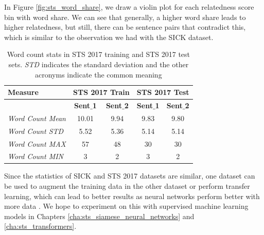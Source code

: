\begin{enumerate}
In Figure \ref{fig:sts_word_share}, we draw a violin plot for each relatedness score bin with word share. We can see that generally, a higher word share leads to higher relatedness, but still, there can be sentence pairs that contradict this, which is similar to the observation we had with the SICK dataset. 


\begin{table}
	\centering
	\begin{tabular}{l|cc|cc}
		\hline
		Measure   & \multicolumn{2}{c|}{STS 2017 Train} & \multicolumn{2}{c}{STS 2017 Test} \\
		\hline
		\multicolumn{1}{l|}{} & \textbf{Sent$\_$1} & \textbf{Sent$\_$2} & \textbf{Sent$\_$1} & \textbf{Sent$\_$2} \\
		\textit{Word Count Mean} & 10.01 & 9.94 & 9.83 & 9.80  \\
		\textit{Word Count STD} & 5.52 & 5.36 & 5.14 & 5.14  \\
		\textit{Word Count MAX} & 57 & 48 & 30 & 30  \\
		\textit{Word Count MIN} & 3 & 2 & 3 & 2  \\
		\hline
	\end{tabular}
	\caption[Word count stats in STS 2017]{Word count stats in STS 2017 training and STS 2017 test sets. \textit{STD} indicates the standard deviation and the other acronyms indicate the common meaning }
	\label{table:sts_2017_sts}
\end{table}

Since the statistics of SICK and STS 2017 datasets are similar, one dataset can be used to augment the training data in the other dataset or perform transfer learning, which can lead to better results as neural networks perform better with more data \autocite{wang-etal-2020-evaluating,info:doi/10.2196/23086}. We hope to experiment on this with supervised machine learning models in Chapters \ref{cha:sts_siamese_neural_networks} and \ref{cha:sts_transformers}.


\end{enumerate}
